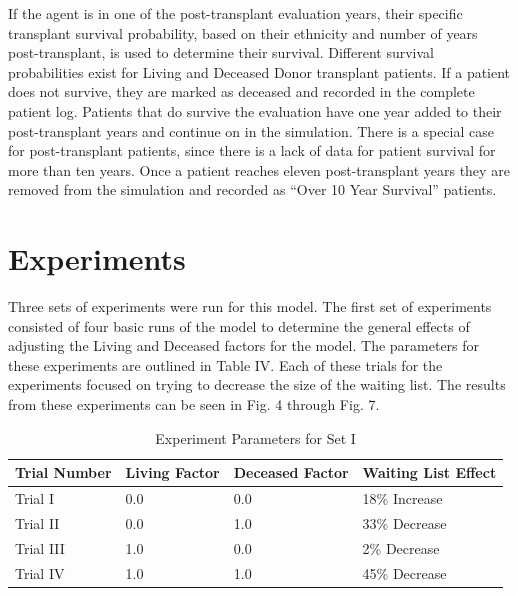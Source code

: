 \documentclass[9pt,a4paper,twocolumn]{scrartcl}
\begin{document}
If the agent is in one of the post-transplant evaluation years, their specific transplant survival probability, based on their ethnicity and number of years post-transplant, is used to determine their survival.  Different survival probabilities exist for Living and Deceased Donor transplant patients.  If a patient does not survive, they are marked as deceased and recorded in the complete patient log.  Patients that do survive the evaluation have one year added to their post-transplant years and continue on in the simulation.  
There is a special case for post-transplant patients, since there is a lack of data for patient survival for more than ten years.  Once a patient reaches eleven post-transplant years they are removed from the simulation and recorded as “Over 10 Year Survival” patients.  



\section{Experiments}

Three sets of experiments were run for this model.  The first set of experiments consisted of four basic runs of the model to determine the general effects of adjusting the Living and Deceased factors for the model.  The parameters for these experiments are outlined in Table IV.  Each of these trials for the experiments focused on trying to decrease the size of the waiting list.  The results from these experiments can be seen in Fig. 4 through Fig. 7.

\begin{table}[ht] 
\caption{Experiment Parameters for Set I} %
\centering %
\begin{tabular}{p{1.5cm} p{1cm} p{1cm} p{2cm}} %
\hline\hline %
Trial Number & Living Factor & Deceased Factor & Waiting List Effect \\ [0.5ex] %
\hline %
Trial I & 0.0 & 0.0 & 18\% Increase \\ %
Trial II & 0.0 & 1.0 & 33\% Decrease \\ 
Trial III & 1.0 & 0.0 & 2\% Decrease \\ 
Trial IV & 1.0 & 1.0 & 45\% Decrease \\ [1ex]
\hline %
\end{tabular} 
\label{table:nonlin} %
\end{table} 
\end{document}

